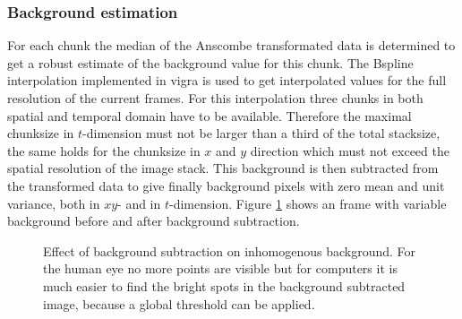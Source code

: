\subsubsection{Background estimation}
For each chunk the median of the Anscombe transformated data is determined to get a robust estimate of the background value for this chunk. 
The Bspline interpolation implemented in vigra \cite{vigra} is used to get interpolated values for the full resolution of the current frames. For this interpolation three chunks in both spatial and temporal domain have to be available. Therefore the maximal chunksize in $t$-dimension must not be larger than a third of the total stacksize, the same holds for the chunksize in $x$ and $y$ direction which must not exceed the spatial resolution of the image stack.\newline
This background is then subtracted from the transformed data to give finally background pixels with zero mean and unit variance, both in $xy$- and in $t$-dimension. Figure \ref{removedBG} shows an frame with variable background before and after background subtraction.
\begin{figure}
\hfill
{}
	\caption{Effect of background subtraction on inhomogenous background. For the human eye no more points are visible but for computers it is much easier to find the bright spots in the background subtracted image, because a global threshold can be applied.}
	\label{removedBG}	
\end{figure}
